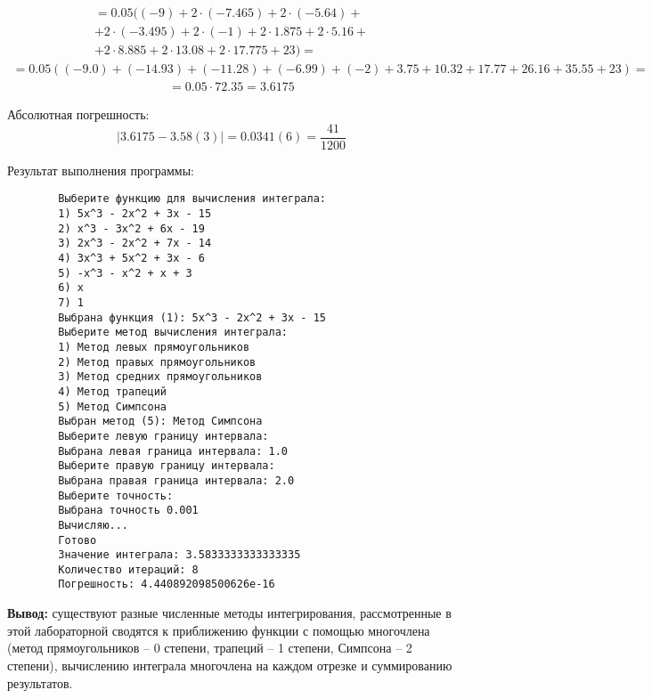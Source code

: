 \documentclass[10pt,a4paper]{article}
\begin{document}
    \begin{gather*}
        =0.05(
        (-9)+2\cdot (-7.465)+2\cdot (-5.64)+\\
        +2\cdot (-3.495)+2\cdot (-1)+2\cdot 1.875+2\cdot 5.16+\\
        +2\cdot 8.885+2\cdot 13.08+2\cdot 17.775+23)=
    \end{gather*}
    \begin{gather*}
        =0.05((-9.0)+(-14.93)+(-11.28)+(-6.99)+(-2)+3.75+10.32+17.77+26.16+35.55+23)=
    \end{gather*}
    \begin{gather*}
        =0.05\cdot 72.35=3.6175
    \end{gather*}

    Абсолютная погрешность:
    \[ |3.6175-3.58(3)|=0.0341(6)=\frac{41}{1200} \]

    Результат выполнения программы:
    \begin{verbatim}
        Выберите функцию для вычисления интеграла:
        1) 5x^3 - 2x^2 + 3x - 15
        2) x^3 - 3x^2 + 6x - 19
        3) 2x^3 - 2x^2 + 7x - 14
        4) 3x^3 + 5x^2 + 3x - 6
        5) -x^3 - x^2 + x + 3
        6) x
        7) 1
        Выбрана функция (1): 5x^3 - 2x^2 + 3x - 15
        Выберите метод вычисления интеграла:
        1) Метод левых прямоугольников
        2) Метод правых прямоугольников
        3) Метод средних прямоугольников
        4) Метод трапеций
        5) Метод Симпсона
        Выбран метод (5): Метод Симпсона
        Выберите левую границу интервала:
        Выбрана левая граница интервала: 1.0
        Выберите правую границу интервала:
        Выбрана правая граница интервала: 2.0
        Выберите точность:
        Выбрана точность 0.001
        Вычисляю...
        Готово
        Значение интеграла: 3.5833333333333335
        Количество итераций: 8
        Погрешность: 4.440892098500626e-16
    \end{verbatim}

    \textbf{Вывод:}
    существуют разные численные методы интегрирования,
    рассмотренные в этой лабораторной сводятся к приближению функции с помощью многочлена
    (метод прямоугольников -- 0 степени, трапеций -- 1 степени, Симпсона -- 2 степени),
    вычислению интеграла многочлена на каждом отрезке и суммированию результатов.
\end{document}

